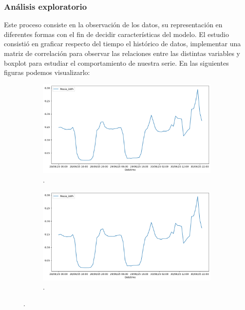 \subsubsection{Análisis exploratorio}
%
%
%
Este proceso consiste en la observación de los datos, su representación en diferentes formas con el fin de decidir características del modelo. El estudio consistió en graficar respecto del tiempo el histórico de datos, implementar una matriz de correlación para observar las relaciones entre las distintas variables y boxplot para estudiar el comportamiento de nuestra serie. En las siguientes figuras podemos visualizarlo:
\begin{figure}[H]
\centering
\begin{subfigure}[b]{0.35\textwidth}
\centering
\includegraphics[width=\textwidth]{figuras/histoico.png}
\caption[Precio de la luz respecto del tiempo]{.}
\label{Precio vs tiempo}
\end{subfigure}
\begin{subfigure}[b]{0.35\textwidth}
\centering
\includegraphics[width=\textwidth]{figuras/histoico.png}
\caption[Matriz de correlación]{.}
\label{Matriz de correlacion}
\end{subfigure}

\end{figure}
